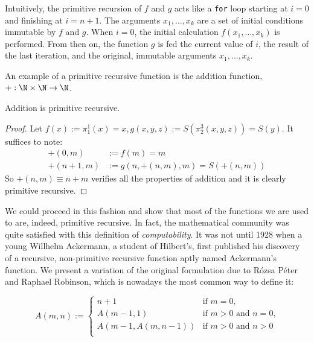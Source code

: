 \documentclass[../main.tex]{memoir}
\begin{document}
\begin{remark}
  Intuitively, the primitive recursion of $f$ and $g$ acts like a \texttt{for} loop starting at $i = 0$ and finishing at $i = n + 1$. The arguments $x_1, \ldots, x_k$ are a set of initial conditions immutable by $f$ and $g$. When $i = 0$, the initial calculation $f(x_1, \ldots, x_k)$ is performed. From then on, the function $g$ is fed the current value of $i$, the result of the last iteration, and the original, immutable arguments $x_1, \ldots, x_k$.
\end{remark}

An example of a primitive recursive function is the addition function, $+: \N \times \N \to \N$.

\begin{theorem}
  Addition is primitive recursive.
\end{theorem}
\begin{proof}
  Let $f(x) := \pi_1^1(x) = x, g(x, y, z) := S(\pi_2^3(x, y, z)) = S(y)$. It suffices to note:
  \begin{align*}
    +(0, m) & := f(m) = m \\
    +(n + 1, m) & := g(n, +(n, m), m) = S(+(n, m))
  \end{align*}
  So $+(n, m) \equiv n + m$ verifies all the properties of addition and it is clearly primitive recursive.
\end{proof}

We could proceed in this fashion and show that most of the functions we are used to are, indeed, primitive recursive. In fact, the mathematical community was quite satisfied with this definition of \textit{computability}. It was not until 1928 when a young Willhelm Ackermann, a student of Hilbert's, first published \cite{ackermann} his discovery of a recursive, non-primitive recursive function aptly named Ackermann's function. We present a variation of the original formulation due to Rózsa Péter and Raphael Robinson, which is nowadays the most common way to define it:

\begin{definition}
  \begin{equation*}
    A(m, n) := \left\{
      \begin{array}{lr}
        n + 1 & \text{if } m = 0 \text{,} \\
        A(m - 1, 1) & \text{if } m > 0 \text{ and } n = 0 \text{,} \\
        A(m - 1, A(m, n - 1)) & \text{if } m > 0 \text{ and } n > 0 \\
      \end{array} \right.
  \end{equation*}
\end{definition}
\end{document}
